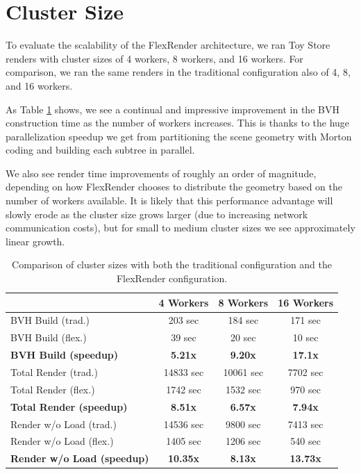 \documentclass[12pt]{ucthesis}
\begin{document}
\section{Cluster Size}
\label{clustersize}

To evaluate the scalability of the FlexRender architecture, we ran Toy Store
renders with cluster sizes of 4 workers, 8 workers, and 16 workers. For
comparison, we ran the same renders in the traditional configuration also of
4, 8, and 16 workers.

As Table \ref{tb:clustersize} shows, we see a continual and impressive
improvement in the BVH construction time as the number of workers increases.
This is thanks to the huge parallelization speedup we get from partitioning
the scene geometry with Morton coding and building each subtree in parallel.

We also see render time improvements of roughly an order of magnitude, depending
on how FlexRender chooses to distribute the geometry based on the number of workers
available. It is likely that this performance advantage will slowly erode as the
cluster size grows larger (due to increasing network communication costs), but
for small to medium cluster sizes we see approximately linear growth.

\begin{table}
\begin{center}
\begin{tabular}{|l||c|c|c|}
    \hline
    & 4 Workers & 8 Workers & 16 Workers \\
    \hline
    \hline
    BVH Build (trad.) & 203 sec & 184 sec & 171 sec \\
    \hline
    BVH Build (flex.) & 39 sec & 20 sec & 10 sec \\
    \hline
    \textbf{BVH Build (speedup)} & \textbf{5.21x} & \textbf{9.20x} & \textbf{17.1x} \\
    \hline
    \hline
    Total Render (trad.) & 14833 sec & 10061 sec & 7702 sec \\
    \hline
    Total Render (flex.) & 1742 sec & 1532 sec & 970 sec \\
    \hline
    \textbf{Total Render (speedup)} & \textbf{8.51x} & \textbf{6.57x} & \textbf{7.94x} \\
    \hline
    \hline
    Render w/o Load (trad.) & 14536 sec & 9800 sec & 7413 sec \\
    \hline
    Render w/o Load (flex.) & 1405 sec & 1206 sec & 540 sec \\
    \hline
    \textbf{Render w/o Load (speedup)} & \textbf{10.35x} & \textbf{8.13x} & \textbf{13.73x} \\
    \hline
\end{tabular}
\caption{Comparison of cluster sizes with both the traditional configuration and the FlexRender configuration.}
\label{tb:clustersize}
\end{center}
\end{table}
\end{document}
